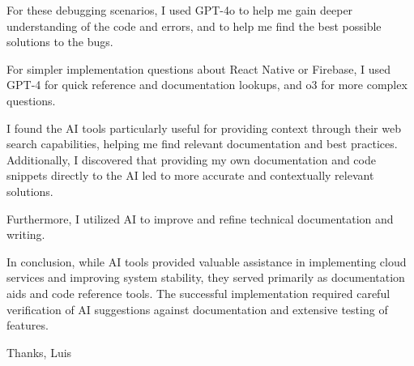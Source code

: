 For these debugging scenarios, I used GPT-4o to help me gain deeper understanding of the code and errors, and to help me find the best possible solutions to the bugs.

For simpler implementation questions about React Native or Firebase, I used GPT-4 for quick reference and documentation lookups, and o3 for more complex questions.

I found the AI tools particularly useful for providing context through their web search capabilities, helping me find relevant documentation and best practices. Additionally, I discovered that providing my own documentation and code snippets directly to the AI led to more accurate and contextually relevant solutions.

Furthermore, I utilized AI to improve and refine technical documentation and writing.

In conclusion, while AI tools provided valuable assistance in implementing cloud services and improving system stability, they served primarily as documentation aids and code reference tools. The successful implementation required careful verification of AI suggestions against documentation and extensive testing of features.

Thanks,
Luis